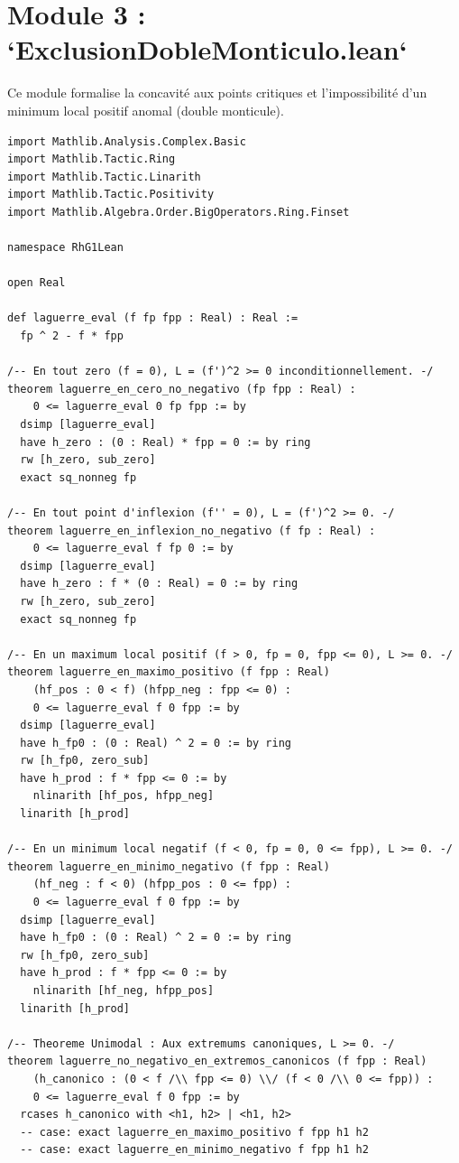 \documentclass[11pt,a4paper]{article}
\theoremstyle{definition}
\theoremstyle{remark}
\begin{document}
\section{Module 3 : `ExclusionDobleMonticulo.lean`}

Ce module formalise la concavité aux points critiques et l'impossibilité d'un minimum local positif anomal (double monticule).

\begin{lstlisting}[language=Lean4]
import Mathlib.Analysis.Complex.Basic
import Mathlib.Tactic.Ring
import Mathlib.Tactic.Linarith
import Mathlib.Tactic.Positivity
import Mathlib.Algebra.Order.BigOperators.Ring.Finset

namespace RhG1Lean

open Real

def laguerre_eval (f fp fpp : Real) : Real :=
  fp ^ 2 - f * fpp

/-- En tout zero (f = 0), L = (f')^2 >= 0 inconditionnellement. -/
theorem laguerre_en_cero_no_negativo (fp fpp : Real) :
    0 <= laguerre_eval 0 fp fpp := by
  dsimp [laguerre_eval]
  have h_zero : (0 : Real) * fpp = 0 := by ring
  rw [h_zero, sub_zero]
  exact sq_nonneg fp

/-- En tout point d'inflexion (f'' = 0), L = (f')^2 >= 0. -/
theorem laguerre_en_inflexion_no_negativo (f fp : Real) :
    0 <= laguerre_eval f fp 0 := by
  dsimp [laguerre_eval]
  have h_zero : f * (0 : Real) = 0 := by ring
  rw [h_zero, sub_zero]
  exact sq_nonneg fp

/-- En un maximum local positif (f > 0, fp = 0, fpp <= 0), L >= 0. -/
theorem laguerre_en_maximo_positivo (f fpp : Real)
    (hf_pos : 0 < f) (hfpp_neg : fpp <= 0) :
    0 <= laguerre_eval f 0 fpp := by
  dsimp [laguerre_eval]
  have h_fp0 : (0 : Real) ^ 2 = 0 := by ring
  rw [h_fp0, zero_sub]
  have h_prod : f * fpp <= 0 := by
    nlinarith [hf_pos, hfpp_neg]
  linarith [h_prod]

/-- En un minimum local negatif (f < 0, fp = 0, 0 <= fpp), L >= 0. -/
theorem laguerre_en_minimo_negativo (f fpp : Real)
    (hf_neg : f < 0) (hfpp_pos : 0 <= fpp) :
    0 <= laguerre_eval f 0 fpp := by
  dsimp [laguerre_eval]
  have h_fp0 : (0 : Real) ^ 2 = 0 := by ring
  rw [h_fp0, zero_sub]
  have h_prod : f * fpp <= 0 := by
    nlinarith [hf_neg, hfpp_pos]
  linarith [h_prod]

/-- Theoreme Unimodal : Aux extremums canoniques, L >= 0. -/
theorem laguerre_no_negativo_en_extremos_canonicos (f fpp : Real)
    (h_canonico : (0 < f /\\ fpp <= 0) \\/ (f < 0 /\\ 0 <= fpp)) :
    0 <= laguerre_eval f 0 fpp := by
  rcases h_canonico with <h1, h2> | <h1, h2>
  -- case: exact laguerre_en_maximo_positivo f fpp h1 h2
  -- case: exact laguerre_en_minimo_negativo f fpp h1 h2


\end{lstlisting}
\end{document}
